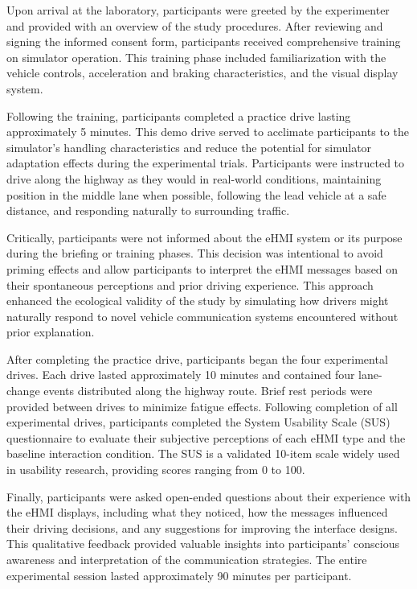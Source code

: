 \documentclass[manuscript,review]{acmart}
\begin{document}
Upon arrival at the laboratory, participants were greeted by the experimenter and provided with an overview of the study procedures. After reviewing and signing the informed consent form, participants received comprehensive training on simulator operation. This training phase included familiarization with the vehicle controls, acceleration and braking characteristics, and the visual display system.

Following the training, participants completed a practice drive lasting approximately 5 minutes. This demo drive served to acclimate participants to the simulator's handling characteristics and reduce the potential for simulator adaptation effects during the experimental trials. Participants were instructed to drive along the highway as they would in real-world conditions, maintaining position in the middle lane when possible, following the lead vehicle at a safe distance, and responding naturally to surrounding traffic.

Critically, participants were not informed about the eHMI system or its purpose during the briefing or training phases. This decision was intentional to avoid priming effects \cite{nichols2008good, rosenthal2009artifacts, orne2002social} and allow participants to interpret the eHMI messages based on their spontaneous perceptions and prior driving experience. This approach enhanced the ecological validity of the study by simulating how drivers might naturally respond to novel vehicle communication systems encountered without prior explanation.

After completing the practice drive, participants began the four experimental drives. Each drive lasted approximately 10 minutes and contained four lane-change events distributed along the highway route. Brief rest periods were provided between drives to minimize fatigue effects. Following completion of all experimental drives, participants completed the System Usability Scale (SUS) questionnaire \cite{brooke1996sus} to evaluate their subjective perceptions of each eHMI type and the baseline interaction condition. The SUS is a validated 10-item scale widely used in usability research, providing scores ranging from 0 to 100.

Finally, participants were asked open-ended questions about their experience with the eHMI displays, including what they noticed, how the messages influenced their driving decisions, and any suggestions for improving the interface designs. This qualitative feedback provided valuable insights into participants' conscious awareness and interpretation of the communication strategies. The entire experimental session lasted approximately 90 minutes per participant.
\end{document}
